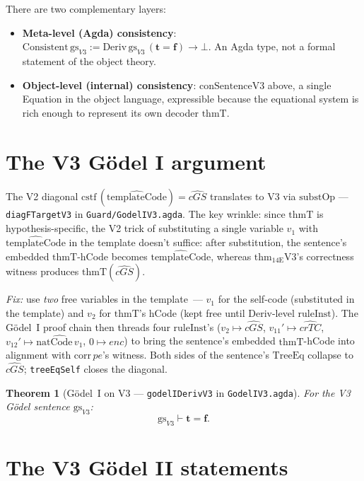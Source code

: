 \documentclass[11pt]{article}
\newtheorem{theorem}{Theorem}
\newcommand{\trueT}{\mathbf{t}}
\newcommand{\falseT}{\mathbf{f}}
\newcommand{\reify}[1]{\widehat{#1}}
\newcommand{\substOp}{\mathrm{substOp}}
\newcommand{\thmT}{\mathrm{thmT}}
\newcommand{\cstf}{\mathrm{cstf}}
\newcommand{\TreeEq}{\mathrm{TreeEq}}
\begin{document}
There are two complementary layers:

\begin{itemize}
\item \textbf{Meta-level (Agda) consistency}:
  $\mathrm{Consistent}\,\mathrm{gs}_{V3} := \mathrm{Deriv}\,\mathrm{gs}_{V3}\,(\trueT=\falseT) \to \bot$.
  An Agda type, not a formal statement of the object theory.
\item \textbf{Object-level (internal) consistency}: $\mathrm{conSentenceV3}$
  above, a single Equation in the object language, expressible because
  the equational system is rich enough to represent its own decoder
  $\thmT$.
\end{itemize}

\section{The V3 G\"odel I argument}

The V2 diagonal $\cstf\,(\reify{\mathrm{templateCode}}) = \reify{cGS}$
translates to V3 via $\substOp$ --- \texttt{diagFTargetV3} in
\texttt{Guard/GodelIV3.agda}.  The key wrinkle: since $\thmT$ is
hypothesis-specific, the V2 trick of substituting a single variable
$v_1$ with $\reify{\mathrm{templateCode}}$ in the template doesn't
suffice: after substitution, the sentence's embedded $\thmT$-hCode
becomes $\reify{\mathrm{templateCode}}$, whereas $\mathrm{thm}_{14\mathrm{E}}\mathrm{V}3$'s
correctness witness produces $\thmT(\reify{cGS})$.

\emph{Fix:} use \emph{two} free variables in the template~---
$v_1$ for the self-code (substituted in the template) and $v_2$ for
$\thmT$'s hCode (kept free until Deriv-level $\mathrm{ruleInst}$).
The G\"odel~I proof chain then threads four $\mathrm{ruleInst}$'s
($v_2 \mapsto \reify{cGS}$, $v_{11}' \mapsto \reify{crTC}$,
$v_{12}' \mapsto \reify{\mathrm{natCode}\,v_1}$, $0 \mapsto enc$) to
bring the sentence's embedded $\thmT$-hCode into alignment with
$\mathrm{corr}\,pe$'s witness.  Both sides of the sentence's $\TreeEq$
collapse to $\reify{cGS}$; \texttt{treeEqSelf} closes the diagonal.

\begin{theorem}[G\"odel~I on V3 --- \texttt{godelIDerivV3} in \texttt{GodelIV3.agda}]
\label{thm:godel1v3}
For the V3 G\"odel sentence $\mathrm{gs}_{V3}$:
\[
  \mathrm{gs}_{V3} \vdash \trueT = \falseT.
\]
\end{theorem}

\section{The V3 G\"odel II statements}
\end{document}
